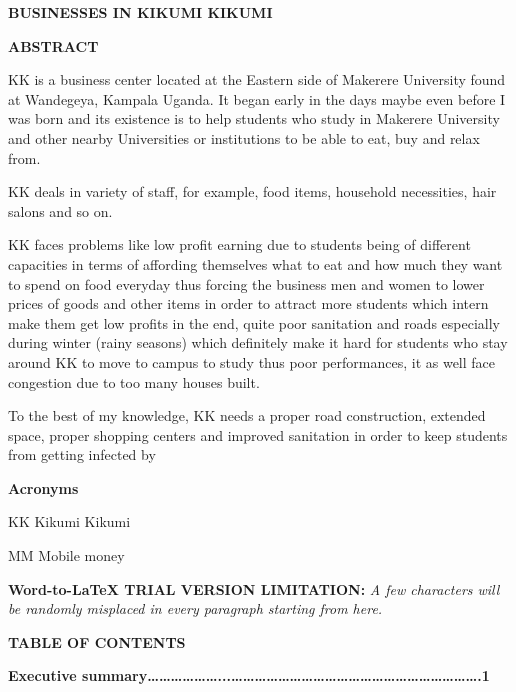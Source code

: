 \documentclass[16pt]{article}
\author{freza}
\title{}
\begin{document}
\begin{center}
\textbf{BUSINESSES IN KIKUMI KIKUMI}
\end{center}

\begin{center}
\textbf{ABSTRACT}
\end{center}

{\raggedright
KK is a business center located at the Eastern side of Makerere University found
at Wandegeya, Kampala Uganda. It began early in the days maybe even before I was
born and its existence is to help students who study in Makerere University and
other nearby Universities or institutions to be able to eat, buy and relax from.
}

{\raggedright
KK deals in variety of staff, for example, food items, household necessities,
hair salons and so on.
}

{\raggedright
KK faces problems like low profit earning due to students being of different
capacities in terms of affording themselves what to eat and how much they want to
spend on food everyday thus forcing the business men and women to lower prices of
goods and other items in order to attract more students which intern make them
get low profits in the end, quite poor sanitation and roads especially during
winter (rainy seasons) which definitely make it hard for students who stay around
KK to move to campus to study thus poor performances, it as well face congestion
due to too many houses built.
}

{\raggedright
To the best of my knowledge, KK needs a proper road construction, extended
space, proper shopping centers and improved sanitation in order to keep students
from getting infected by
}

\begin{center}
\textbf{{\Large Acronyms}}
\end{center}

{\raggedright
KK       Kikumi Kikumi
}

{\raggedright
MM    Mobile money
}

\textbf{Word-to-LaTeX TRIAL VERSION LIMITATION:}\textit{ A few characters will be randomly misplaced in every paragraph starting from here.}

\begin{center}
\textbf{{\Large TABLE OF CONTENTS}}
\end{center}

{\raggedright
\textbf{Executive
summary\ldots{}\ldots{}\ldots{}\ldots{}\ldots{}\ldots{}...\ldots{}\ldots{}\ldots{}\ldots{}\ldots{}\ldots{}\ldots{}\ldots{}\ldots{}\ldots{}\ldots{}\ldots{}\ldots{}\ldots{}\ldots{}\ldots{}\ldots{}\ldots{}\ldots{}\ldots{}\ldots{}.1}
}
\end{document}
